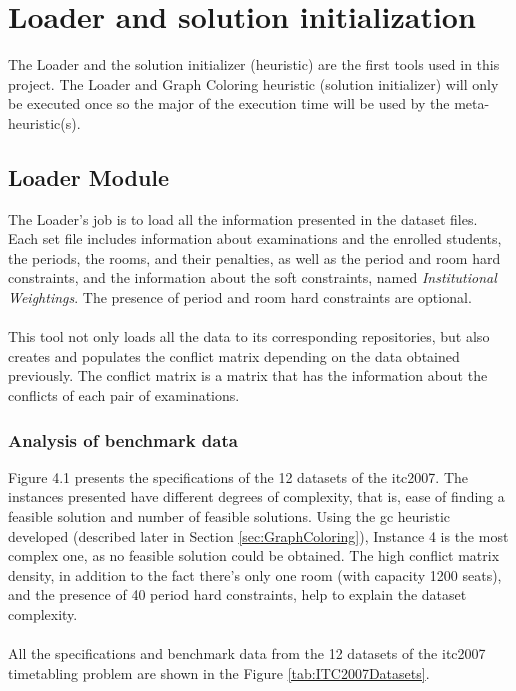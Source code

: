 \chapter{Loader and solution initialization}
\label{sec:SolutionInit}
\thispagestyle{plain}

The Loader and the solution initializer (heuristic) are the first tools used in this project. The Loader and Graph Coloring heuristic (solution initializer) will only be executed once so the major of the execution time will be used by the meta-heuristic(s).

\section{Loader Module}
\label{sec:Loader}

The Loader's job is to load all the information presented in the dataset files. Each set file includes information about examinations and the enrolled students, the periods, the rooms, and their penalties, as well as the period and room hard constraints, and the information about the soft constraints, named \textit{Institutional Weightings}. The presence of period and room hard constraints are optional.\\
\\
This tool not only loads all the data to its corresponding repositories, but also creates and populates the conflict matrix depending on the data obtained previously. The conflict matrix is a matrix that has the information about the conflicts of each pair of examinations.

\subsection{Analysis of benchmark data}

Figure 4.1 presents the specifications of the 12 datasets of the \gls{itc2007}. The instances presented have different degrees of complexity, that is, ease of finding a feasible solution and number of feasible solutions. Using the \gls{gc} heuristic developed (described later in Section \ref{sec:GraphColoring}), Instance 4 is the most complex one, as no feasible solution could be obtained. The high conflict matrix density, in addition to the fact there's only one room (with capacity 1200 seats), and the presence of 40 period hard constraints, help to explain the dataset complexity.\\
\\
All the specifications and benchmark data from the 12 datasets of the \gls{itc2007} timetabling problem are shown in the Figure \ref{tab:ITC2007Datasets}.

